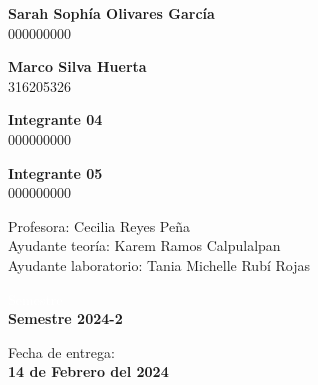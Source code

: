 \begin{titlepage}
\begin{minipage}{0.4\textwidth}
        \textbf{\large{Sarah Sophía Olivares García}}\\
        000000000
\end{minipage}
\begin{minipage}{0.4\textwidth}
    \begin{flushright}
        \textbf{\large{Marco Silva Huerta}}\\
        316205326        
    \end{flushright}
\end{minipage}

\vspace{5mm}

\begin{minipage}{0.4\textwidth}
    \textbf{\large{Integrante 04}}\\    
    000000000
\end{minipage}
\begin{minipage}{0.4\textwidth}
    \begin{flushright}
        \textbf{\large{Integrante 05}}\\
        000000000
    \end{flushright}
\end{minipage}

\vspace{10mm}

\begin{minipage}{0.8\textwidth}
    \begin{flushleft} \large
        Profesora: Cecilia Reyes Peña\\
        Ayudante teoría: Karem Ramos Calpulalpan \\
        Ayudante laboratorio: Tania Michelle Rubí Rojas\\                    
    \end{flushleft}
\end{minipage}

\vspace{20mm}

\begin{minipage}{0.4\textwidth}
    \textcolor{white}{Semestre}\\
    \large\textbf{Semestre 2024-2}      
\end{minipage}
\begin{minipage}{0.4\textwidth}
    \begin{flushright}
        {\large Fecha de entrega:\\
         \textbf{14 de Febrero del 2024}}
    \end{flushright}
\end{minipage}

\makeatother

\vfill 
\end{titlepage}